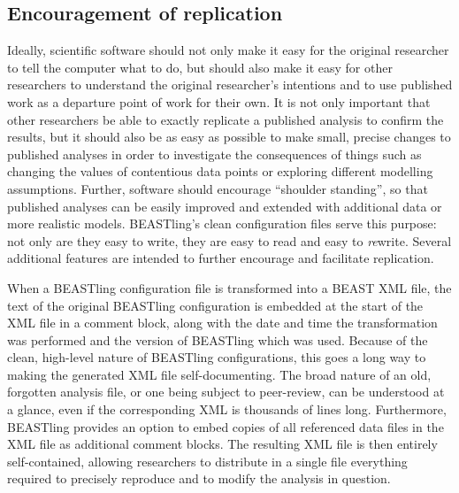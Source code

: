 \documentclass[twocolumn,10pt]{scrartcl}
\begin{document}

\subsection{Encouragement of replication}

Ideally, scientific software should not only make it easy for the original researcher to tell the computer what to do, but should also make it easy for other researchers to understand the original researcher's intentions and to use published work as a departure point of work for their own.  It is not only important that other researchers be able to exactly replicate a published analysis to confirm the results, but it should also be as easy as possible to make small, precise changes to published analyses in order to investigate the consequences of things such as changing the values of contentious data points or exploring different modelling assumptions.  Further, software should encourage ``shoulder standing'', so that published analyses can be easily improved and extended with additional data or more realistic models.  BEASTling's clean configuration files serve this purpose: not only are they easy to write, they are easy to read and easy to \emph{re}write.  Several additional features are intended to further encourage and facilitate replication.

When a BEASTling configuration file is transformed into a BEAST XML file, the text of the original BEASTling configuration is embedded at the start of the XML file in a comment block, along with the date and time the transformation was performed and the version of BEASTling which was used.  Because of the clean, high-level nature of BEASTling configurations, this goes a long way to making the generated XML file self-documenting.  The broad nature of an old, forgotten analysis file, or one being subject to peer-review, can be understood at a glance, even if the corresponding XML is thousands of lines long.  Furthermore, BEASTling provides an option to embed copies of all referenced data files in the XML file as additional comment blocks.  The resulting XML file is then entirely self-contained, allowing researchers to distribute in a single file everything required to precisely reproduce and to modify the analysis in question.
\end{document}
